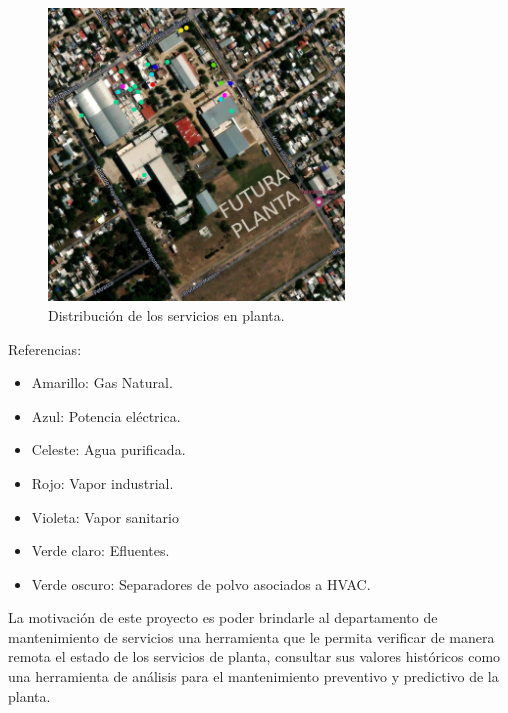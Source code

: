 \begin{figure}[htbp]
	\centering
	\includegraphics[width=0.7\textwidth]{./Figures/ROEMMERS.png}
	\caption{Distribución de los servicios en planta.}
	\label{fig:texmaker}
\end{figure}
Referencias:
\begin{itemize}
	\item Amarillo: Gas Natural.
	\item Azul: Potencia eléctrica.
	\item Celeste: Agua purificada.
	\item Rojo: Vapor industrial.
	\item Violeta: Vapor sanitario
	\item Verde claro: Efluentes.
	\item Verde oscuro: Separadores de polvo asociados a HVAC.
\end{itemize}

La motivación de este proyecto es poder brindarle al departamento de mantenimiento de servicios una herramienta que le permita verificar de manera remota el estado de los servicios de planta, consultar sus valores históricos como una herramienta de análisis para el mantenimiento preventivo y predictivo de la planta.


%
%
%


